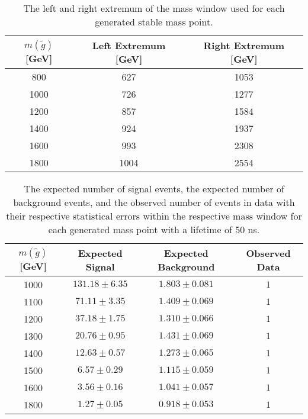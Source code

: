 \begin{table}[!htbp]
  \begin{center}
    \begin{tabular}{ccc}
        \hline
        $m(\tilde{g})$ [GeV]  & Left Extremum [GeV] & Right Extremum [GeV] \\
        \hline
        800    & 627 & 1053 \\
        1000    & 726 & 1277 \\
        1200    & 857 & 1584 \\
        1400    & 924 & 1937 \\
        1600    & 993 & 2308 \\
        1800    & 1004 & 2554 \\
        \hline
    \end{tabular}
  \end{center}
  \caption{The left and right extremum of the mass window used for each generated stable mass point.}
  \label{tab:app_window_stable}
\end{table}



\begin{table}[!htbp]
  \begin{center}
    \begin{tabular}{cccc}
      \hline
      $m(\tilde{g})$ [GeV]  & Expected Signal & Expected Background & Observed Data\\ 
      \hline
      1000    & $131.18 \pm 6.35 $ & $1.803 \pm 0.081 $ & $1$ \\
      1100    & $71.11 \pm 3.35 $  & $1.409 \pm 0.069 $ & $1$ \\
      1200    & $37.18 \pm 1.75 $  & $1.310 \pm 0.066 $ & $1$ \\
      1300    & $20.76 \pm 0.95 $  & $1.431 \pm 0.069 $ & $1$ \\
      1400    & $12.63 \pm 0.57 $  & $1.273 \pm 0.065 $ & $1$ \\
      1500    & $6.57 \pm 0.29 $   & $1.115 \pm 0.059 $ & $1$ \\
      1600    & $3.56 \pm 0.16 $   & $1.041 \pm 0.057 $ & $1$ \\
      1800    & $1.27 \pm 0.05 $   & $0.918 \pm 0.053 $ & $1$ \\
      \hline
    \end{tabular}
  \end{center}
  \caption{The expected number of signal events, the expected number of background events, and the observed number of events in data with their respective statistical errors within the respective mass window for each generated mass point with a lifetime of 50 ns.}
  \label{tab:app_counts_50ns}
\end{table}

